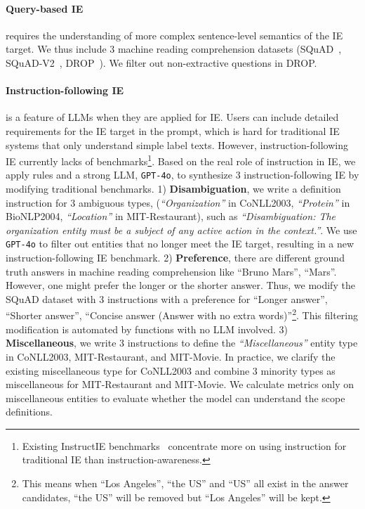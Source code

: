 \paragraph{Query-based IE} requires the understanding of more complex sentence-level semantics of the IE target. We thus include $3$ machine reading comprehension datasets (SQuAD~\citep{SQuAD}, SQuAD-V2~\citep{SQuAD-V2}, DROP~\citep{DROP}). We filter out non-extractive questions in DROP.

\paragraph{Instruction-following IE} is a feature of LLMs when they are applied for IE. Users can include detailed requirements for the IE target in the prompt, which is hard for traditional IE systems that only understand simple label texts. However, instruction-following IE currently lacks of benchmarks\footnote{Existing InstructIE benchmarks~\citep{InstructIE_UIUC,InstructIE_ZJU} concentrate more on using instruction for traditional IE than instruction-awareness.}. Based on the real role of instruction in IE, we apply rules and a strong LLM, \texttt{GPT-4o}, to synthesize $3$ instruction-following IE by modifying traditional benchmarks. 1) \textbf{Disambiguation}, we write a definition instruction for $3$ ambiguous types, (\textit{``Organization''} in CoNLL2003, \textit{``Protein''} in BioNLP2004, \textit{``Location''} in MIT-Restaurant), such as \textit{``Disambiguation: The organization entity must be a subject of any active action in the context.''}. We use \texttt{GPT-4o} to filter out entities that no longer meet the IE target, resulting in a new instruction-following IE benchmark. 2) \textbf{Preference}, there are different ground truth answers in machine reading comprehension like ``Bruno Mars'', ``Mars''. However, one might prefer the longer or the shorter answer. Thus, we modify the SQuAD dataset with $3$ instructions with a preference for ``Longer answer'', ``Shorter answer'', ``Concise answer (Answer with no extra words)''\footnote{This means when ``Los Angeles'', ``the US'' and ``US'' all exist in the answer candidates, ``the US'' will be removed but ``Los Angeles'' will be kept.}. This filtering modification is automated by functions with no LLM involved. 3) \textbf{Miscellaneous}, we write $3$ instructions to define the \textit{``Miscellaneous''} entity type in CoNLL2003, MIT-Restaurant, and MIT-Movie. In practice, we clarify the existing miscellaneous type for CoNLL2003 and combine $3$ minority types as miscellaneous for MIT-Restaurant and MIT-Movie. We calculate metrics only on miscellaneous entities to evaluate whether the model can understand the scope definitions.

